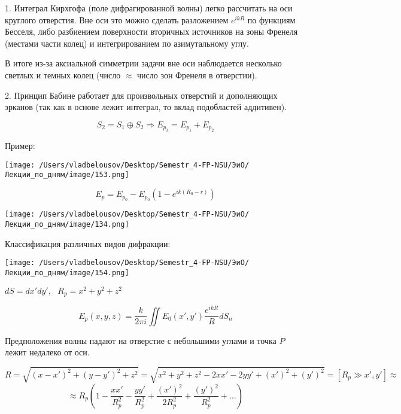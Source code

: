 \documentclass[12pt, a4paper]{report}
\begin{document}
\fi


1. Интеграл Кирхгофа (поле дифрагированной волны) легко рассчитать на оси круглого отверстия. Вне оси это можно сделать  разложением \( e^{ i kR }  \) по функциям Бесселя, либо разбиением поверхности вторичных источников на зоны Френеля (местами части колец) и интегрированием по азимутальному углу. 

В итоге из-за аксиальной симметрии задачи вне оси наблюдается несколько светлых и темных колец (число \( \approx \) число зон Френеля в отверстии).

2. Принцип Бабине работает для произвольных отверстий и дополняющих эрканов (так как в основе лежит интеграл, то вклад подобластей аддитивен). 

\[ S_2 = S_1 \oplus S_2 \Rightarrow E_{ p_3} = E_{ p_1 } + E_{ p_2 }    \] 

Пример: 

\begin{center}
    \texttt{[image: /Users/vladbelousov/Desktop/Semestr\_4-FP-NSU/ЭиО/Лекции\_по\_дням/image/153.png]}
\end{center}

\[ E_p = E_{ p_0} - E_{ p_0} (1 - e^{ i k (R_0 -r )} )   \] 

\begin{center}
    \texttt{[image: /Users/vladbelousov/Desktop/Semestr\_4-FP-NSU/ЭиО/Лекции\_по\_дням/image/134.png]}
\end{center}

Классификация различных видов дифракции: 

\begin{center}
    \texttt{[image: /Users/vladbelousov/Desktop/Semestr\_4-FP-NSU/ЭиО/Лекции\_по\_дням/image/154.png]}
\end{center}
\( dS = dx ' dy ' , \text{ }  R_p = x  ^2 + y ^2 + z ^2   \) 

\[ E_p (x,y ,z ) = \frac{k}{2 \pi i } \iint E_0 (x ', y ' )\frac{ e^{ i k R } }{R } d S_n    \] 

Предположения волны падают на отверстие с небольшими углами и точка \( P \) лежит недалеко от оси. 

\[ R = \sqrt{(x - x' ) ^2 + (y - y ' ) ^2 + z ^2 } = \sqrt{x ^2 + y ^2 + z ^2 - 2 x x' - 2 y y' + (x ' )  ^2  + (y')  ^2  } =[R_p \gg x', y '] \approx  \] 
\[ \approx R_p \left(  1 - \frac{ x x ' }{R_p ^2 } - \frac{y y ' }{R_p ^2 } + \frac{(x' ) ^2 }{2R_p ^2 }+ \frac{ (y ' ) ^2 }{R_p ^2 } + ...       \right) \] 
\end{document}
